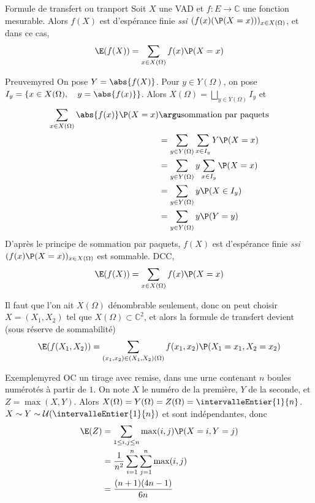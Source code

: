     \begin{theo}{Formule de transfert ou tranport}{}
        Soit $X$ une VAD et $f : E \to \mathbb{C}$ une fonction mesurable. Alors $f(X)$ est d’espérance finie \textit{ssi} $(f(x)(\P(X = x)))_{x \in X(\Omega)}$, et dans ce cas, 
        \[ \E(f(X)) = \sum_{x \in X(\Omega)} f(x) \P(X = x) \] 
    \end{theo}

    \begin{demo}{Preuve}{myred}
        On pose $Y = \abs{f(X)}$. Pour $y \in Y(\Omega)$, on pose $I_y = \left\{x \in X(\Omega), \quad y = \abs{f(x)}\right\}$. Alors $X(\Omega) = \bigsqcup_{y \in Y(\Omega)} I_y$ et 
        \begin{align*}
            \sum_{x \in X(\Omega)} \abs{f(x)} \P(X = x) 
            &\argu \text{sommation par paquets} \\
            &= \sum_{y \in Y(\Omega)} \sum_{x \in I_y} Y \P(X = x) \\
            &= \sum_{y \in Y(\Omega)} y \sum_{x \in I_y} \P(X = x) \\
            &= \sum_{y \in Y(\Omega)} y \P(X \in I_y) \\
            &= \sum_{y \in Y(\Omega)} y \P(Y = y)  
        \end{align*}
        D’après le principe de sommation par paquets, $f(X)$ est d’espérance finie \textit{ssi} $(f(x)\P(X=x))_{x \in X(\Omega)}$ est sommable. DCC, 
        \[ \E(f(X)) = \sum_{x \in X(\Omega)} f(x) \P(X = x) \]    
    \end{demo}

    Il faut que l’on ait $X(\Omega)$ dénombrable seulement, donc on peut choisir $X = (X_1,X_2)$ tel que $X(\Omega) \subset \mathbb{C}^2$, et alors la formule de transfert devient (sous réserve de sommabilité)
    \[ \E(f(X_1,X_2)) = \sum_{(x_1,x_2) \in (X_1,X_2)(\Omega)} f(x_1,x_2) \P(X_1 = x_1,X_2 = x_2) \]  
    
    \begin{omed}{Exemple}{myred}
        OC un tirage avec remise, dans une urne contenant $n$ boules numérotés à partir de $1$. On note $X$ le numéro de la première, $Y$ de la seconde, et $Z = \max(X,Y)$. Alors $X(\Omega) = Y(\Omega) = Z(\Omega) = \intervalleEntier{1}{n}$. $X \sim Y \sim \mathcal{U}(\intervalleEntier{1}{n})$ et sont indépendantes, donc 
        \begin{align*}
            \E(Z) &= \sum_{1 \leq i,j \leq n} \max(i,j) \P(X=i, Y=j) \\
            &= \frac{1}{n^2} \sum_{i=1}^n \sum_{j=1}^{n} \max(i,j) \\
            &= \frac{(n+1)(4n-1)}{6n}
        \end{align*} 
    \end{omed}

